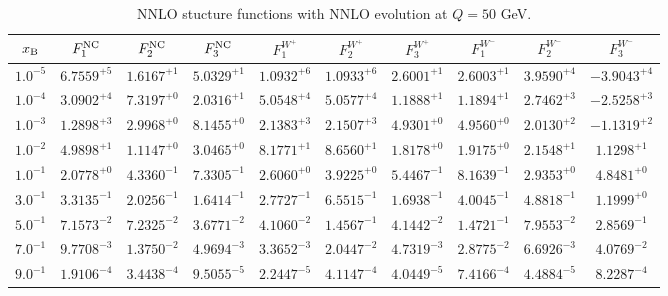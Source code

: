 \begin{table}[h]
\begin{adjustbox}{width=\textwidth}
\begin{tabular}{|c||c|c|c|c|c|c|c|c|c|}
\hline
$x_{\rm B}$ & $F_1^{\rm NC}$ & $F_2^{\rm NC}$ & $F_3^{\rm NC}$ & $F_1^{W^+}$ & $F_2^{W^+}$ & $F_3^{W^+}$ & $F_1^{W^-}$ & $F_2^{W^-}$ & $F_3^{W^-}$ \\
\hline
$ 1.0^{-5}$ & $ 6.7559^{+5}$ & $ 1.6167^{+1}$ & $ 5.0329^{+1}$ & $ 1.0932^{+6}$ & $ 1.0933^{+6}$ & $ 2.6001^{+1}$ & $ 2.6003^{+1}$ & $ 3.9590^{+4}$ & $-3.9043^{+4}$ \\
$ 1.0^{-4}$ & $ 3.0902^{+4}$ & $ 7.3197^{+0}$ & $ 2.0316^{+1}$ & $ 5.0548^{+4}$ & $ 5.0577^{+4}$ & $ 1.1888^{+1}$ & $ 1.1894^{+1}$ & $ 2.7462^{+3}$ & $-2.5258^{+3}$ \\
$ 1.0^{-3}$ & $ 1.2898^{+3}$ & $ 2.9968^{+0}$ & $ 8.1455^{+0}$ & $ 2.1383^{+3}$ & $ 2.1507^{+3}$ & $ 4.9301^{+0}$ & $ 4.9560^{+0}$ & $ 2.0130^{+2}$ & $-1.1319^{+2}$ \\
$ 1.0^{-2}$ & $ 4.9898^{+1}$ & $ 1.1147^{+0}$ & $ 3.0465^{+0}$ & $ 8.1771^{+1}$ & $ 8.6560^{+1}$ & $ 1.8178^{+0}$ & $ 1.9175^{+0}$ & $ 2.1548^{+1}$ & $ 1.1298^{+1}$ \\
$ 1.0^{-1}$ & $ 2.0778^{+0}$ & $ 4.3360^{-1}$ & $ 7.3305^{-1}$ & $ 2.6060^{+0}$ & $ 3.9225^{+0}$ & $ 5.4467^{-1}$ & $ 8.1639^{-1}$ & $ 2.9353^{+0}$ & $ 4.8481^{+0}$ \\
$ 3.0^{-1}$ & $ 3.3135^{-1}$ & $ 2.0256^{-1}$ & $ 1.6414^{-1}$ & $ 2.7727^{-1}$ & $ 6.5515^{-1}$ & $ 1.6938^{-1}$ & $ 4.0045^{-1}$ & $ 4.8818^{-1}$ & $ 1.1999^{+0}$ \\
$ 5.0^{-1}$ & $ 7.1573^{-2}$ & $ 7.2325^{-2}$ & $ 3.6771^{-2}$ & $ 4.1060^{-2}$ & $ 1.4567^{-1}$ & $ 4.1442^{-2}$ & $ 1.4721^{-1}$ & $ 7.9553^{-2}$ & $ 2.8569^{-1}$ \\
$ 7.0^{-1}$ & $ 9.7708^{-3}$ & $ 1.3750^{-2}$ & $ 4.9694^{-3}$ & $ 3.3652^{-3}$ & $ 2.0447^{-2}$ & $ 4.7319^{-3}$ & $ 2.8775^{-2}$ & $ 6.6926^{-3}$ & $ 4.0769^{-2}$ \\
$ 9.0^{-1}$ & $ 1.9106^{-4}$ & $ 3.4438^{-4}$ & $ 9.5055^{-5}$ & $ 2.2447^{-5}$ & $ 4.1147^{-4}$ & $ 4.0449^{-5}$ & $ 7.4166^{-4}$ & $ 4.4884^{-5}$ & $ 8.2287^{-4}$ \\
\hline
\end{tabular}
\end{adjustbox}\caption{NNLO stucture functions with NNLO evolution at $Q = 50$ GeV.}
\label{tab:N2LO-Q50}
\end{table}


